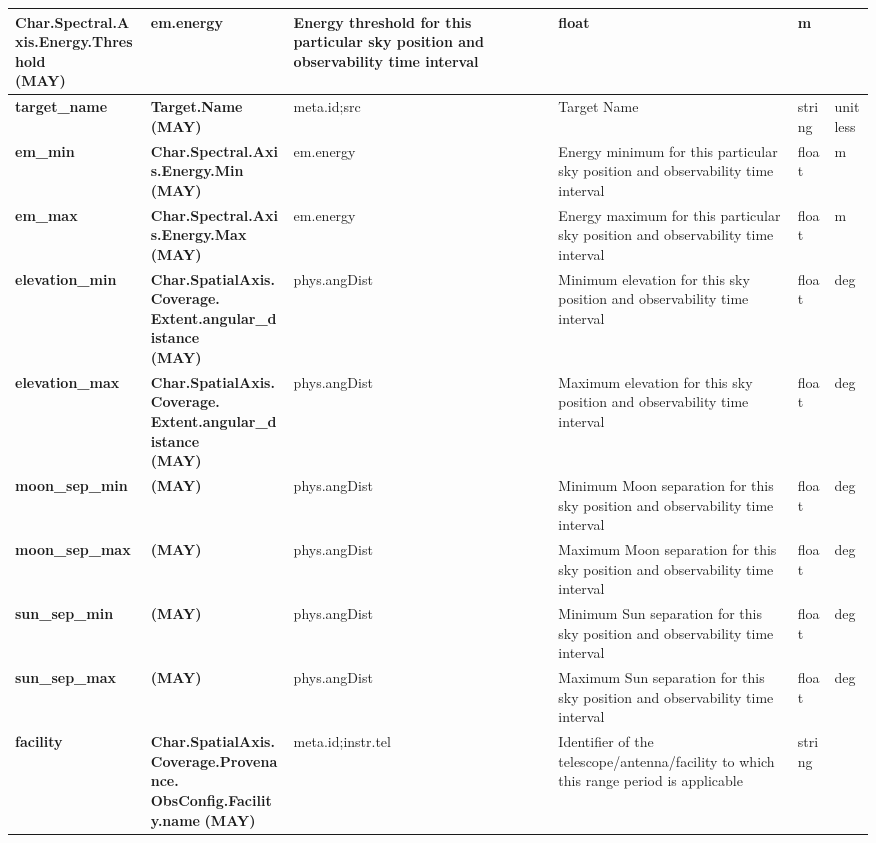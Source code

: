 \documentclass[11pt,a4paper]{ivoatex/ivoa}
\begin{document}
\begin{appendices}
\begin{table}[h]
\begin{adjustbox}{angle=90}
\begin{tabular}{|p{25mm}|p{50mm}|p{20mm}|p{40mm}|p{15mm}|p{10mm}|}
{Char.Spectral.Axis.Energy.Threshold \newline
(MAY)} & em.energy & Energy
threshold for this particular sky position and observability time interval
& float & m \\
\hline
\pagebreak
\textbf{target\_name} & \textbf{Target.Name  \newline
(MAY)} & meta.id;src &
Target Name & string & unitless \\
\hline
\textbf{em\_min} & \textbf{Char.Spectral.Axis.Energy.Min \newline
(MAY)} &
em.energy & Energy minimum for this particular sky position and
observability time interval & float & m \\
\hline
\textbf{em\_max} & \textbf{Char.Spectral.Axis.Energy.Max \newline
(MAY)} &
em.energy & Energy maximum for this particular sky position and
observability time interval & float & m \\
\hline
\textbf{elevation\_min} & \textbf{
Char.SpatialAxis.Coverage. \newline
Extent.angular\_distance \newline
(MAY)} & phys.angDist
& Minimum elevation for this sky position and observability time interval &
float & deg \\
\hline
\textbf{elevation\_max} & \textbf{
Char.SpatialAxis.Coverage. \newline
Extent.angular\_distance \newline
(MAY)} & phys.angDist
& Maximum elevation for this sky position and observability time interval &
float & deg \\
\hline
\textbf{moon\_sep\_min} & \textbf{(MAY)} & phys.angDist & Minimum
Moon separation for this sky position and observability time interval &
float & deg \\
\hline
\textbf{moon\_sep\_max} & \textbf{(MAY)} & phys.angDist & Maximum
Moon separation for this sky position and observability time interval &
float & deg \\
\hline
\textbf{sun\_sep\_min} & \textbf{(MAY)} & phys.angDist & Minimum Sun
separation for this sky position and observability time interval & float &
deg \\
\hline
\textbf{sun\_sep\_max} & \textbf{(MAY)} & phys.angDist & Maximum Sun
separation for this sky position and observability time interval & float &
deg \\
\hline
\textbf{facility} & \textbf{Char.SpatialAxis.Coverage.Provenance.\newline ObsConfig.Facility.name} 
\newline
\textbf{(MAY)} & meta.id;instr.tel & Identifier of the 
telescope/antenna/facility to which this range period is applicable 
& string & \\
\hline
\end{tabular}
\end{adjustbox}
\end{table}
\FloatBarrier
\end{appendices}
\end{document}
